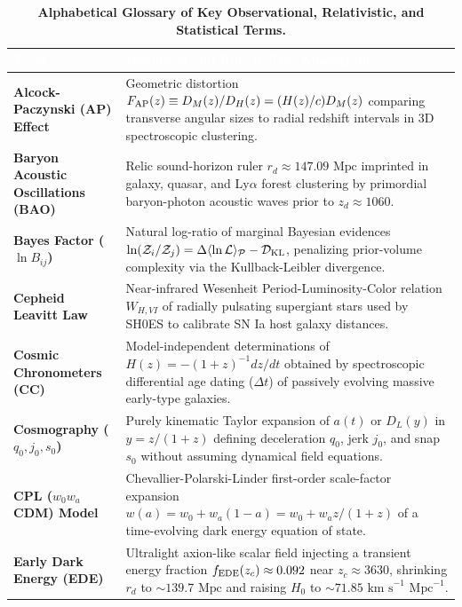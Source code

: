 \documentclass[11pt,letterpaper]{article}
\renewcommand{\arraystretch}{1.20}
\begin{document}
\begin{table}[!htbp]
\centering
\caption{\textbf{Alphabetical Glossary of Key Observational, Relativistic, and Statistical Terms.}}
\label{tab:glossary_terms}
\footnotesize
\renewcommand{\arraystretch}{1.22}
\begin{tabularx}{\textwidth}{>{\bfseries\color{primary}}p{} X}
\toprule
\rowcolor{primary} \textcolor{white}{\textbf{Term}} & \textcolor{white}{\textbf{Definition and Role in This Monograph}} \\
\midrule
Alcock-Paczynski (AP) Effect & Geometric distortion $F_{\rm AP}(z) \equiv D_M(z)/D_H(z) = (H(z)/c)D_M(z)$ comparing transverse angular sizes to radial redshift intervals in 3D spectroscopic clustering. \\
Baryon Acoustic Oscillations (BAO) & Relic sound-horizon ruler $r_d \approx 147.09\text{ Mpc}$ imprinted in galaxy, quasar, and Ly$\alpha$ forest clustering by primordial baryon-photon acoustic waves prior to $z_d \approx 1060$. \\
Bayes Factor ($\ln B_{ij}$) & Natural log-ratio of marginal Bayesian evidences $\ln(\mathcal{Z}_i/\mathcal{Z}_j) = \Delta\langle\ln\mathcal{L}\rangle_{\mathcal{P}} - \mathcal{D}_{\rm KL}$, penalizing prior-volume complexity via the Kullback-Leibler divergence. \\
Cepheid Leavitt Law & Near-infrared Wesenheit Period-Luminosity-Color relation $W_{H,VI}$ of radially pulsating supergiant stars used by SH0ES to calibrate SN Ia host galaxy distances. \\
Cosmic Chronometers (CC) & Model-independent determinations of $H(z) = -(1+z)^{-1}dz/dt$ obtained by spectroscopic differential age dating ($\Delta t$) of passively evolving massive early-type galaxies. \\
Cosmography ($q_0, j_0, s_0$) & Purely kinematic Taylor expansion of $a(t)$ or $D_L(y)$ in $y = z/(1+z)$ defining deceleration $q_0$, jerk $j_0$, and snap $s_0$ without assuming dynamical field equations. \\
CPL ($w_0 w_a$CDM) Model & Chevallier-Polarski-Linder first-order scale-factor expansion $w(a) = w_0 + w_a(1-a) = w_0 + w_a z/(1+z)$ of a time-evolving dark energy equation of state. \\
Early Dark Energy (EDE) & Ultralight axion-like scalar field injecting a transient energy fraction $f_{\rm EDE}(z_c) \approx 0.092$ near $z_c \approx 3630$, shrinking $r_d$ to $\sim 139.7\text{ Mpc}$ and raising $H_0$ to $\sim 71.85\text{ km s}^{-1}\text{ Mpc}^{-1}$. \\

\end{tabularx}
\end{table}
\end{document}
